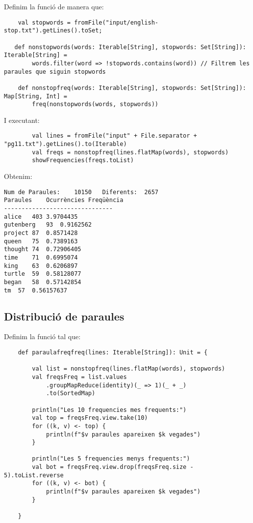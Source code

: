 \documentclass{article}
\begin{document}
Definim la funció de manera que:

\begin{lstlisting}
    val stopwords = fromFile("input/english-stop.txt").getLines().toSet;

   def nonstopwords(words: Iterable[String], stopwords: Set[String]): Iterable[String] =
        words.filter(word => !stopwords.contains(word)) // Filtrem les paraules que siguin stopwords

    def nonstopfreq(words: Iterable[String], stopwords: Set[String]): Map[String, Int] =
        freq(nonstopwords(words, stopwords))
\end{lstlisting}

I executant:

\begin{lstlisting}
        val lines = fromFile("input" + File.separator + "pg11.txt").getLines().to(Iterable)
        val freqs = nonstopfreq(lines.flatMap(words), stopwords)
        showFrequencies(freqs.toList)
\end{lstlisting}

Obtenim:

\begin{verbatim}
Num de Paraules:	10150	Diferents:	2657
Paraules	Ocurrències	Freqüència
-------------------------------
alice	403	3.9704435
gutenberg	93	0.9162562
project	87	0.8571428
queen	75	0.7389163
thought	74	0.72906405
time	71	0.6995074
king	63	0.6206897
turtle	59	0.58128077
began	58	0.57142854
tm	57	0.56157637
\end{verbatim}

\subsection{Distribució de paraules}

Definim la funció tal que:

\begin{lstlisting}
    def paraulafreqfreq(lines: Iterable[String]): Unit = {

        val list = nonstopfreq(lines.flatMap(words), stopwords)
        val freqsFreq = list.values
            .groupMapReduce(identity)(_ => 1)(_ + _)
            .to(SortedMap)

        println("Les 10 frequencies mes frequents:")
        val top = freqsFreq.view.take(10)
        for ((k, v) <- top) {
            println(f"$v paraules apareixen $k vegades")
        }

        println("Les 5 frequencies menys frequents:")
        val bot = freqsFreq.view.drop(freqsFreq.size - 5).toList.reverse
        for ((k, v) <- bot) {
            println(f"$v paraules apareixen $k vegades")
        }

    }
\end{lstlisting}
\end{document}
